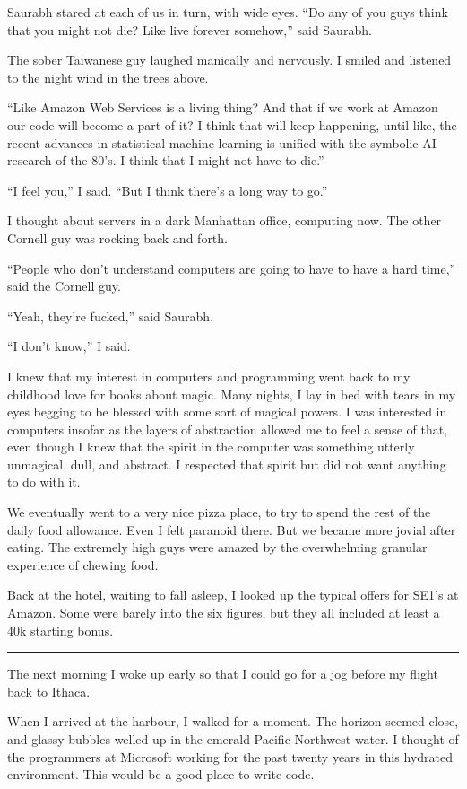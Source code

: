 Saurabh stared at each of us in turn, with wide eyes.  ``Do any of you guys
think that you might not die?  Like live forever somehow,'' said Saurabh.  

The sober Taiwanese guy laughed manically and nervously.  I smiled and listened
to the night wind in the trees above.

``Like Amazon Web Services is a living thing?  And that if we work at Amazon our
code will become a part of it?  I think that will keep happening, until like,
the recent advances in statistical machine learning is unified with the symbolic
AI research of the 80's.  I think that I might not have to die.''

``I feel you,'' I said.  ``But I think there's a long way to go.''  

I thought about servers in a dark Manhattan office, computing now.  The other
Cornell guy was rocking back and forth.

``People who don't understand computers are going to have to have a hard time,''
said the Cornell guy.

``Yeah, they're fucked,'' said Saurabh.

``I don't know,'' I said.

I knew that my interest in computers and programming went back to my childhood
love for books about magic.  Many nights, I lay in bed with tears in my eyes
begging to be blessed with some sort of magical powers.  I was interested in
computers insofar as the layers of abstraction allowed me to feel a sense of
that, even though I knew that the spirit in the computer was something utterly
unmagical, dull, and abstract.  I respected that spirit but did not want
anything to do with it.  

We eventually went to a very nice pizza place, to try to spend the rest of the
daily food allowance.   Even I felt paranoid there.  But we became more jovial
after eating.  The extremely high guys were amazed by the overwhelming granular
experience of chewing food.  

Back at the hotel, waiting to fall asleep, I looked up the typical offers for
SE1's at Amazon.  Some were barely into the six figures, but they all included
at least a 40k starting bonus.

\plainfancybreak{12pt}{2}{* * *}

The next morning I woke up early so that I could go for a jog before my flight
back to Ithaca.

When I arrived at the harbour, I walked for a moment.  The horizon seemed close,
and glassy bubbles welled up in the emerald Pacific Northwest water.  I thought
of the programmers at Microsoft working for the past twenty years in this
hydrated environment.  This would be a good place to write code.

